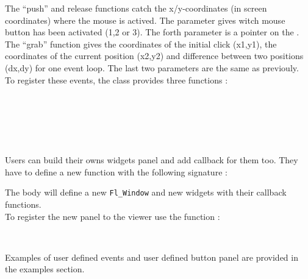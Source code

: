 The ``push'' and release functions catch the x/y-coordinates (in
screen coordinates) where the mouse is actived. The 
parameter gives witch mouse button has been activated (1,2 or 3). The forth
parameter is a pointer on the .\\
The ``grab'' function gives the coordinates of the initial click
(x1,y1), the coordinates of the current position (x2,y2) and
difference between two positions (dx,dy) for one event loop. The last
two parameters are the same as previouly.\\
To register these events, the  class provides three
functions : 


  \\
 \\
\\
\\
\\


Users can build their owns widgets panel and add callback for them
too. They have to define a new function with the following signature :



The body will define a new {\tt Fl\_Window} and new widgets with their 
callback functions.\\
To register the new panel to the viewer use the function :


 \\

Examples of user defined events and user defined button panel are
provided in the examples section.

